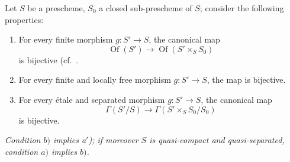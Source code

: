 \begin{proposition}[18.5.4]
\label{IV.18.5.4}
Let $S$ be a prescheme, $S_0$ a closed sub-prescheme of $S$;
consider the following properties:
\begin{enumerate}[label=\emph{\alph*)}]
  \item For every finite morphism $g:S'\to S$, the canonical map
\[
\label{IV.18.5.4.1}
\operatorname{Of}(S')\to\operatorname{Of}(S'\times_S S_0)
\tag{18.5.4.1}
  \]
is bijective {\upshape(}cf.\ .
  \item[a$'$)] For every finite and locally free morphism $g:S'\to S$, the map  is bijective.
  \item For every \'etale and separated morphism $g:S'\to S$, the canonical map
\[
\label{IV.18.5.4.2}
\Gamma(S'/S)\to\Gamma(S'\times_S S_0/S_0)
\tag{18.5.4.2}
\]
is bijective.
\end{enumerate}
\emph{Condition $b)$ implies a$'$);
if moreover $S$ is quasi-compact and quasi-separated, condition $a)$ implies $b)$.}
\end{proposition}

